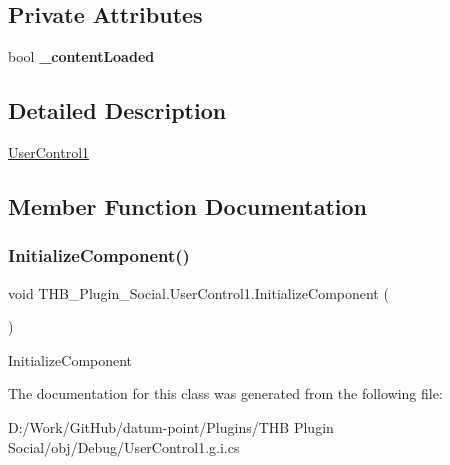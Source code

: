 \subsection*{Private Attributes}
\begin{DoxyCompactItemize}
\item 
\mbox{\label{class_t_h_b___plugin___social_1_1_user_control1_a3f1b09bbced6d4b895eff4b6a376601e}} 
bool {\bfseries \+\_\+content\+Loaded}
\end{DoxyCompactItemize}


\subsection{Detailed Description}
\mbox{\hyperlink{class_t_h_b___plugin___social_1_1_user_control1}{User\+Control1}} 



\subsection{Member Function Documentation}
\mbox{\label{class_t_h_b___plugin___social_1_1_user_control1_a25fbdc8418a5a7c4054d91d6aeb14fcf}} 
\subsubsection{\texorpdfstring{Initialize\+Component()}{InitializeComponent()}}
{\footnotesize\ttfamily void T\+H\+B\+\_\+\+Plugin\+\_\+\+Social.\+User\+Control1.\+Initialize\+Component (\begin{DoxyParamCaption}{ }\end{DoxyParamCaption})}



Initialize\+Component 



The documentation for this class was generated from the following file\+:\begin{DoxyCompactItemize}
\item 
D\+:/\+Work/\+Git\+Hub/datum-\/point/\+Plugins/\+T\+H\+B Plugin Social/obj/\+Debug/User\+Control1.\+g.\+i.\+cs\end{DoxyCompactItemize}
